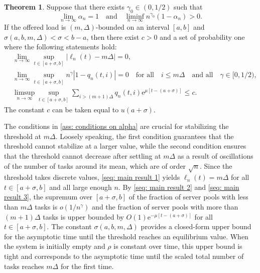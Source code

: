 \documentclass[a4paper, 12pt]{article}
\theoremstyle{definition}
\newtheorem{theorem}{Theorem}
\newcommand{\e}{\mathrm{e}}
\begin{document}
\begin{theorem}
	\label{the: main theorem exponential case}
	Suppose that there exists $\gamma_0 \in (0, 1/ 2)$ such that
	\begin{equation}
		\label{ass: conditions on alpha}
		\lim_{n \to \infty} \alpha_n = 1 \quad \text{and} \quad \liminf_{n \to \infty} n^{\gamma_0}(1 - \alpha_n) > 0.
	\end{equation}
	If the offered load is $(m, \Delta)$-bounded on an interval $[a, b]$ and $\sigma(a, b, m, \Delta) < \sigma < b - a$, then there exist $c > 0$ and a set of probability one where the following statements hold:
	\begin{subequations}
		\begin{align}
			&\lim_{n \to \infty} \sup_{t \in [a + \sigma, b]} |\ell_n(t) - m \Delta| = 0, \label{seq: main result 1} \\
			&\lim_{n \to \infty} \sup_{t \in [a + \sigma, b]} n^\gamma\left|1 - q_n(t, i)\right| = 0 \quad \text{for all} \quad i \leq m \Delta \quad \text{and all} \quad \gamma \in [0, 1/2), \label{seq: main result 2} \\
			&\limsup_{n \to \infty} \sup_{t \in [a + \sigma, b]} \sum_{i > (m + 1)\Delta} q_n(t, i)\e^{\mu\left[t - (a + \sigma)\right]} \leq c. \label{seq: main result 3}
		\end{align} 
	\end{subequations}
	The constant $c$ can be taken equal to $u(a + \sigma)$.
\end{theorem}

The conditions in \eqref{ass: conditions on alpha} are crucial for stabilizing the threshold at $m\Delta$. Loosely speaking, the first condition guarantees that the threshold cannot stabilize at a larger value, while the second condition ensures that the threshold cannot decrease after settling at $m\Delta$ as a result of oscillations of the number of tasks around its mean, which are of order $\sqrt{n}$. Since the threshold takes discrete values, \eqref{seq: main result 1} yields $\ell_n(t) = m \Delta$ for all $t \in [a + \sigma, b]$ and all large enough $n$. By \eqref{seq: main result 2} and \eqref{seq: main result 3}, the supremum over $[a + \sigma, b]$ of the fraction of server pools with less than $m\Delta$ tasks is $o\left(1 / n^{\gamma}\right)$ and the fraction of server pools with more than $(m + 1) \Delta$ tasks is upper bounded by $O(1)\e^{-\mu[t - (a + \sigma)]}$ for all $t \in [a + \sigma, b]$. The constant $\sigma(a, b, m, \Delta)$ provides a closed-form upper bound for the asymptotic time until the threshold reaches an equilibrium value. When the system is initially empty and $\rho$ is constant over time, this upper bound is tight and corresponds to the asymptotic time until the scaled total number of tasks reaches $m\Delta$ for the first time.
\end{document}
